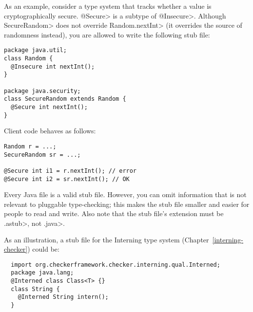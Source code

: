 
As an example, consider a type system that tracks whether a value is
cryptographically secure.  \<@Secure> is a subtype of \<@Insecure>.
Although \<SecureRandom> does not override \<Random.nextInt> (it overrides
the source of randomness instead), you are allowed to write the following
stub file:

\begin{Verbatim}
package java.util;
class Random {
  @Insecure int nextInt();
}

package java.security;
class SecureRandom extends Random {
  @Secure int nextInt();
}
\end{Verbatim}

Client code behaves as follows:

\begin{Verbatim}
Random r = ...;
SecureRandom sr = ...;

@Secure int i1 = r.nextInt(); // error
@Secure int i2 = sr.nextInt(); // OK
\end{Verbatim}



Every Java file is a valid stub file.  However, you can omit information
that is not relevant to pluggable type-checking; this makes the stub file
smaller and easier for people to read and write.
Also note that the stub file's extension must be \<.astub>, not \<.java>.

As an illustration, a stub file for the Interning type system
(Chapter~\ref{interning-checker}) could be:

\begin{Verbatim}
  import org.checkerframework.checker.interning.qual.Interned;
  package java.lang;
  @Interned class Class<T> {}
  class String {
    @Interned String intern();
  }
\end{Verbatim}

